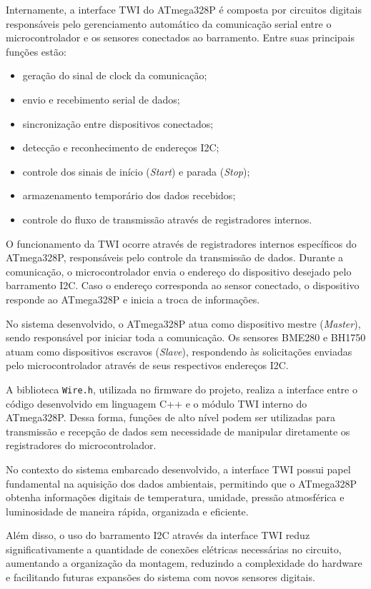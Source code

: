 \documentclass[a4paper,12pt]{article}
\begin{document}
Internamente, a interface TWI do ATmega328P é composta por circuitos digitais responsáveis pelo gerenciamento automático da comunicação serial entre o microcontrolador e os sensores conectados ao barramento. Entre suas principais funções estão:

\begin{itemize}
\item geração do sinal de clock da comunicação;
\item envio e recebimento serial de dados;
\item sincronização entre dispositivos conectados;
\item detecção e reconhecimento de endereços I2C;
\item controle dos sinais de início (\textit{Start}) e parada (\textit{Stop});
\item armazenamento temporário dos dados recebidos;
\item controle do fluxo de transmissão através de registradores internos.
\end{itemize}

O funcionamento da TWI ocorre através de registradores internos específicos do ATmega328P, responsáveis pelo controle da transmissão de dados. Durante a comunicação, o microcontrolador envia o endereço do dispositivo desejado pelo barramento I2C. Caso o endereço corresponda ao sensor conectado, o dispositivo responde ao ATmega328P e inicia a troca de informações.

No sistema desenvolvido, o ATmega328P atua como dispositivo mestre (\textit{Master}), sendo responsável por iniciar toda a comunicação. Os sensores BME280 e BH1750 atuam como dispositivos escravos (\textit{Slave}), respondendo às solicitações enviadas pelo microcontrolador através de seus respectivos endereços I2C.

A biblioteca \texttt{Wire.h}, utilizada no firmware do projeto, realiza a interface entre o código desenvolvido em linguagem C++ e o módulo TWI interno do ATmega328P. Dessa forma, funções de alto nível podem ser utilizadas para transmissão e recepção de dados sem necessidade de manipular diretamente os registradores do microcontrolador.

No contexto do sistema embarcado desenvolvido, a interface TWI possui papel fundamental na aquisição dos dados ambientais, permitindo que o ATmega328P obtenha informações digitais de temperatura, umidade, pressão atmosférica e luminosidade de maneira rápida, organizada e eficiente.

Além disso, o uso do barramento I2C através da interface TWI reduz significativamente a quantidade de conexões elétricas necessárias no circuito, aumentando a organização da montagem, reduzindo a complexidade do hardware e facilitando futuras expansões do sistema com novos sensores digitais.
\end{document}
